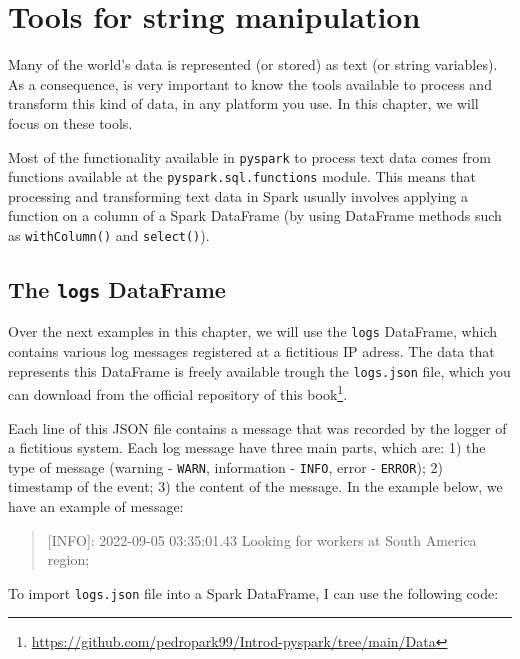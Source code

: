 \documentclass[
  11pt,
  letterpaper,
  DIV=11,
  numbers=noendperiod]{scrreprt}
\begin{document}

\hypertarget{sec-string-tools}{%
\chapter{Tools for string manipulation}\label{sec-string-tools}}

Many of the world's data is represented (or stored) as text (or string
variables). As a consequence, is very important to know the tools
available to process and transform this kind of data, in any platform
you use. In this chapter, we will focus on these tools.

Most of the functionality available in \texttt{pyspark} to process text
data comes from functions available at the
\texttt{pyspark.sql.functions} module. This means that processing and
transforming text data in Spark usually involves applying a function on
a column of a Spark DataFrame (by using DataFrame methods such as
\texttt{withColumn()} and \texttt{select()}).

\hypertarget{the-logs-dataframe}{%
\section{\texorpdfstring{The \texttt{logs}
DataFrame}{The logs DataFrame}}\label{the-logs-dataframe}}

Over the next examples in this chapter, we will use the \texttt{logs}
DataFrame, which contains various log messages registered at a
fictitious IP adress. The data that represents this DataFrame is freely
available trough the \texttt{logs.json} file, which you can download
from the official repository of this book\footnote{\url{https://github.com/pedropark99/Introd-pyspark/tree/main/Data}}.

Each line of this JSON file contains a message that was recorded by the
logger of a fictitious system. Each log message have three main parts,
which are: 1) the type of message (warning - \texttt{WARN}, information
- \texttt{INFO}, error - \texttt{ERROR}); 2) timestamp of the event; 3)
the content of the message. In the example below, we have an example of
message:

\begin{quote}
{[}INFO{]}: 2022-09-05 03:35:01.43 Looking for workers at South America
region;
\end{quote}

To import \texttt{logs.json} file into a Spark DataFrame, I can use the
following code:
\end{document}
